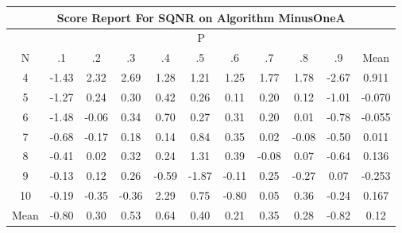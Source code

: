 \documentclass[11pt,a4paper]{report}
\begin{document}
\begin{longtable}{ | c || c | c | c | c | c | c | c | c | c || c |}
\hline
\multicolumn{11}{|c|}{ Score Report For SQNR on Algorithm MinusOneA} \\
\hline
\multicolumn{11}{|c|}{ P } \\
\hline
N & .1 & .2 & .3 & .4 & .5 & .6 & .7 & .8 & .9 & Mean\\
 \hline
 \hline
 \endhead
  4 &  \cellcolor[HTML]{FFD7D7} -1.43 &  \cellcolor[HTML]{C7C7FF} 2.32 &  \cellcolor[HTML]{BFBFFF} 2.69 &  \cellcolor[HTML]{DFDFFF} 1.28 &  \cellcolor[HTML]{DFDFFF} 1.21 &  \cellcolor[HTML]{DFDFFF} 1.25 &  \cellcolor[HTML]{CFCFFF} 1.77 &  \cellcolor[HTML]{CFCFFF} 1.78 &  \cellcolor[HTML]{FFBFBF} -2.67 & 0.911 \\
  5 &  \cellcolor[HTML]{FFDFDF} -1.27 &  \cellcolor[HTML]{F7F7FF} 0.24 &  \cellcolor[HTML]{F7F7FF} 0.30 &  \cellcolor[HTML]{F7F7FF} 0.42 &  \cellcolor[HTML]{F7F7FF} 0.26 &  \cellcolor[HTML]{FFFFFF} 0.11 &  \cellcolor[HTML]{F7F7FF} 0.20 &  \cellcolor[HTML]{FFFFFF} 0.12 &  \cellcolor[HTML]{FFE7E7} -1.01 & -0.070 \\
  6 &  \cellcolor[HTML]{FFD7D7} -1.48 &  \cellcolor[HTML]{FFFFFF} -0.06 &  \cellcolor[HTML]{F7F7FF} 0.34 &  \cellcolor[HTML]{EFEFFF} 0.70 &  \cellcolor[HTML]{F7F7FF} 0.27 &  \cellcolor[HTML]{F7F7FF} 0.31 &  \cellcolor[HTML]{F7F7FF} 0.20 &  \cellcolor[HTML]{FFFFFF} 0.01 &  \cellcolor[HTML]{FFEFEF} -0.78 & -0.055 \\
  7 &  \cellcolor[HTML]{FFEFEF} -0.68 &  \cellcolor[HTML]{FFF7F7} -0.17 &  \cellcolor[HTML]{F7F7FF} 0.18 &  \cellcolor[HTML]{FFFFFF} 0.14 &  \cellcolor[HTML]{E7E7FF} 0.84 &  \cellcolor[HTML]{F7F7FF} 0.35 &  \cellcolor[HTML]{FFFFFF} 0.02 &  \cellcolor[HTML]{FFFFFF} -0.08 &  \cellcolor[HTML]{FFEFEF} -0.50 & 0.011 \\
  8 &  \cellcolor[HTML]{FFF7F7} -0.41 &  \cellcolor[HTML]{FFFFFF} 0.02 &  \cellcolor[HTML]{F7F7FF} 0.32 &  \cellcolor[HTML]{F7F7FF} 0.24 &  \cellcolor[HTML]{DFDFFF} 1.31 &  \cellcolor[HTML]{F7F7FF} 0.39 &  \cellcolor[HTML]{FFFFFF} -0.08 &  \cellcolor[HTML]{FFFFFF} 0.07 &  \cellcolor[HTML]{FFEFEF} -0.64 & 0.136 \\
  9 &  \cellcolor[HTML]{FFFFFF} -0.13 &  \cellcolor[HTML]{FFFFFF} 0.12 &  \cellcolor[HTML]{F7F7FF} 0.26 &  \cellcolor[HTML]{FFEFEF} -0.59 &  \cellcolor[HTML]{FFCFCF} -1.87 &  \cellcolor[HTML]{FFFFFF} -0.11 &  \cellcolor[HTML]{F7F7FF} 0.25 &  \cellcolor[HTML]{FFF7F7} -0.27 &  \cellcolor[HTML]{FFFFFF} 0.07 & -0.253 \\
  10 &  \cellcolor[HTML]{FFF7F7} -0.19 &  \cellcolor[HTML]{FFF7F7} -0.35 &  \cellcolor[HTML]{FFF7F7} -0.36 &  \cellcolor[HTML]{C7C7FF} 2.29 &  \cellcolor[HTML]{EFEFFF} 0.75 &  \cellcolor[HTML]{FFE7E7} -0.80 &  \cellcolor[HTML]{FFFFFF} 0.05 &  \cellcolor[HTML]{F7F7FF} 0.36 &  \cellcolor[HTML]{FFF7F7} -0.24 & 0.167 \\
 \hline
 \hline
Mean &  \cellcolor[HTML]{FFE7E7} -0.80 &  \cellcolor[HTML]{F7F7FF} 0.30 &  \cellcolor[HTML]{EFEFFF} 0.53 &  \cellcolor[HTML]{EFEFFF} 0.64 &  \cellcolor[HTML]{F7F7FF} 0.40 &  \cellcolor[HTML]{F7F7FF} 0.21 &  \cellcolor[HTML]{F7F7FF} 0.35 &  \cellcolor[HTML]{F7F7FF} 0.28 &  \cellcolor[HTML]{FFE7E7} -0.82 &  \cellcolor[HTML]{FFFFFF} 0.12
\end{longtable}
\end{document}
